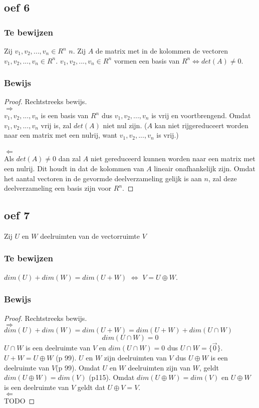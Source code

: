 \documentclass[lineaire_algebra_oplossingen.tex]{subfiles}
\begin{document}
\subsection{oef 6}
\subsubsection*{Te bewijzen}
Zij $v_1,v_2,...,v_n \in R^n$ $n$. Zij $A$ de matrix met in de kolommen de vectoren $v_1,v_2,...,v_n \in R^n$.
$v_1,v_2,...,v_n \in R^n$ vormen een basis van $R^n \Leftrightarrow det(A) \neq 0$.
\subsubsection*{Bewijs}
\begin{proof}
Rechtstreeks bewijs.\\
\emph{$\Rightarrow$}\\
$v_1,v_2,...,v_n$ is een basis van $R^n$ dus $v_1,v_2,...,v_n$ is vrij en voortbrengend. Omdat $v_1,v_2,...,v_n$ vrij is, zal $det(A)$ niet nul zijn. ($A$ kan niet rijgereduceert worden naar een matrix met een nulrij, want $v_1,v_2,...,v_n$ is vrij.)\\\\
\emph{$\Leftarrow$}\\
Als $det(A) \neq 0$ dan zal $A$ niet gereduceerd kunnen worden naar een matrix met een nulrij. Dit houdt in dat de kolommen van $A$ lineair onafhankelijk zijn. Omdat het aantal vectoren in de gevormde deelverzameling gelijk is aan $n$, zal deze deelverzameling een basis zijn voor $R^n$.
\end{proof}

\subsection{oef 7}
Zij $U$ en $W$ deelruimten van de vectorruimte $V$
\subsubsection*{Te bewijzen}
$dim(U) + dim(W) = dim(U+W)$ $\Leftrightarrow$ $V = U \oplus W$.
\subsubsection*{Bewijs}
\begin{proof}
Rechtstreeks bewijs.\\
\emph{$\Rightarrow$}\\
$dim(U) + dim(W) = dim(U+W)= dim(U+W) + dim(U\cap W)$
\[
dim(U\cap W) = 0
\]
$U \cap W$ is een deelruimte van $V$ en $dim(U\cap W) = 0$ dus $U \cap W = \{\vec{0}\}$.
$U+W = U\oplus W$ (p 99). $U$ en $W$ zijn deelruimten van $V$ dus $U\oplus W$ is een deelruimte van $V$(p 99). Omdat $U$ en $W$ deelruimten zijn van $W$, geldt $dim(U \oplus W) = dim(V)$ (p115). Omdat $dim(U \oplus W) = dim(V)$ en $U \oplus W$ is een deelruimte van $V$ geldt dat $U \oplus V = V$.\\
\emph{$\Leftarrow$}\\
TODO
\end{proof}
\end{document}
